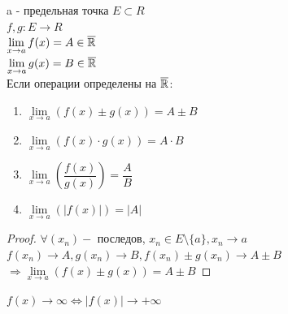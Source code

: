 
a - предельная точка $ E \subset R $ \\
$ f, g : E \rightarrow R $ \\
$ \lim\limits_{x \rightarrow a} f(x) = A \in \overline{\mathbb{R}} $\\
$ \lim\limits_{x \rightarrow a} g(x) = B \in \overline{\mathbb{R}} $\\
Если операции определены на $ \overline{\mathbb{R}}$:
\begin{enumerate}
	\item $ \lim\limits_{x \rightarrow a} (f(x) \pm g(x)) = A \pm B $
	\item $  \lim\limits_{x \rightarrow a} (f(x) \cdot g(x)) = A \cdot B $
	\item $  \lim\limits_{x \rightarrow a} (\dfrac{f(x)}{g(x)}) = \dfrac{A}{B} $ 
	\item $  \lim\limits_{x \rightarrow a} (|f(x)|) = |A| $
\end{enumerate}
\begin{proof}
	$ \forall (x_n) - $ последов, $ x_n \in E \setminus \{a\} , x_n \rightarrow a $ \\
	$ f(x_n) \rightarrow A, g(x_n) \rightarrow B,  f(x_n) \pm g(x_n) \rightarrow A \pm B $\\
	$ \Rightarrow \lim\limits_{x \rightarrow a} (f(x) \pm g(x)) = A \pm B $
\end{proof}
$ f(x) \rightarrow \infty \Leftrightarrow |f(x)| \rightarrow +\infty $\\


